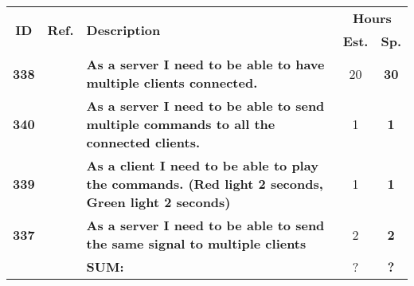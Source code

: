   \label{tab:sprint2stories}
 \def\arraystretch{1.25}
 
\begin{longtable}{ccXcc}
\toprule[0.5mm]
\multirow{2}{*}{\textbf{ID}} &
\multirow{2}{*}{\textbf{Ref.}} & \multirow{2}{*}{\textbf{Description}} & \multicolumn{2}{c}{\textbf{Hours}} \\
 				& & & \textbf{Est.} & \textbf{Sp.} \\ 				
\midrule

\textbf{338} 	& {?}
	& {\bf As a server I need to be able to have multiple clients connected.} 	& 	20		& \textbf{30} \\
	
\textbf{340} 	& {?}
	& {\bf As a server I need to be able to send multiple commands to all the connected clients. } 	& 		1	& \textbf{1} \\

\textbf{339} 	& {?}
	& {\bf  As a client I need to be able to play the commands. (Red light 2 seconds, Green light 2 seconds)} 	& 		1	& \textbf{1} \\

\textbf{337} 	& {?}
	& {\bf  As a server I need to be able to send the same signal to multiple clients} 	& 		2	& \textbf{2} \\		
				
\hline
				&& \textbf{SUM:}		&		?	& \textbf{?}\\																			
\bottomrule[0.5mm]
\end{longtable}
